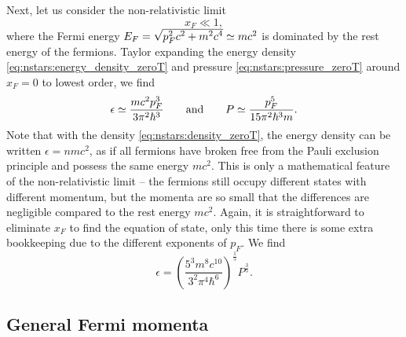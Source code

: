 Next, let us consider the non-relativistic limit
\begin{equation}
	x_F \ll 1,
\label{eq:nstars:nr_limit}
\end{equation}
where the Fermi energy $E_F = \sqrt{\smash[b]{p_F^2 c^2 + m^2 c^4}} \simeq m c^2$ is dominated by the rest energy of the fermions.
Taylor expanding the energy density \eqref{eq:nstars:energy_density_zeroT} and pressure \eqref{eq:nstars:pressure_zeroT} around $x_F = 0$ to lowest order, we find
\begin{equation}
	\epsilon \simeq \frac{m c^2 p_F^3}{3 \pi^2 \hbar^3}
	\qquad \text{and} \qquad
	P        \simeq \frac{p_F^5}{15 \pi^2 \hbar^3 m} .
\end{equation}
Note that with the density \eqref{eq:nstars:density_zeroT}, the energy density can be written $\epsilon = n m c^2$,
as if all fermions have broken free from the Pauli exclusion principle and possess the same energy $mc^2$.
This is only a mathematical feature of the non-relativistic limit -- the fermions still occupy different states with different momentum, but the momenta are so small that the differences are negligible compared to the rest energy $mc^2$.
Again, it is straightforward to eliminate $x_F$ to find the equation of state, only this time there is some extra bookkeeping due to the different exponents of $p_F$.
We find
\begin{equation}
	\epsilon = \left( \frac{5^3 m^8 c^{10}}{3^2 \pi^4 \hbar^6} \right)^{\frac15}  P^{\frac35} .
\label{eq:nstars:nr_eos}
\end{equation}

\iffalse
Dimensionless equation of state
\begin{equation}
	\diml{\epsilon} = \left[ \frac{4^2 5^3}{3^4 \pi^2} \frac{m^8 c^6 r_0^6}{m_0^2 \hbar^6} \diml{P}^3 \right]^{\frac{1}{5}}
\end{equation}
\fi

\subsection{General Fermi momenta}
\label{sec:nstars:gr_limit}

